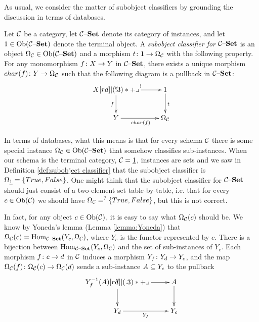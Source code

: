 \documentclass[CT4S-EN-RU]{subfiles}
\begin{document}
\begin{blockRUS}
\end{blockRUS}

\begin{blockENG}
As usual, we consider the matter of subobject classifiers by grounding the discussion in terms of databases.
\end{blockENG}

\begin{blockRUS}
\end{blockRUS}

\begin{definitionENG}
Let $\mcC$ be a category, let $\mcC\set$ denote its category of instances, and let $1\in\Ob(\mcC\set)$ denote the terminal object. A {\em subobject classifier for $\mcC\set$} is an object $\Omega_\mcC\in\Ob(\mcC\set)$ and a morphism $t\taking 1\to\Omega_\mcC$ with the following property. For any monomorphism $f\taking X\to Y$ in $\mcC\set$, there exists a unique morphism $char(f)\taking Y\to\Omega_\mcC$ such that the following diagram is a pullback in $\mcC\set$:
$$
\xymatrix@=25pt{X\ar[r]^{!}\ar[d]_f\ullimit&1\ar[d]^t\\Y\ar[r]_{char(f)}&\Omega_\mcC
}
$$
\end{definitionENG}

\begin{definitionRUS}
\end{definitionRUS}

\begin{blockENG}
In terms of databases, what this means is that for every schema $\mcC$ there is some special instance $\Omega_\mcC\in\Ob(\mcC\set)$ that somehow classifies sub-instances. When our schema is the terminal category, $\mcC=\ul{1}$, instances are sets and we saw in Definition \ref{def:subobject classifier} that the subobject classifier is $\Omega_{\ul{1}}=\{True, False\}$. One might think that the subobject classifier for $\mcC\set$ should just consist of a two-element set table-by-table, i.e. that for every $c\in\Ob(\mcC)$ we should have $\Omega_{\mcC}=^?\{True,False\}$, but this is not correct. 
\end{blockENG}

\begin{blockRUS}
\end{blockRUS}

\begin{blockENG}
In fact, for any object $c\in\Ob(\mcC)$, it is easy to say what $\Omega_\mcC(c)$ should be. We know by Yoneda's lemma (Lemma \ref{lemma:Yoneda}) that $\Omega_\mcC(c)=\Hom_{\mcC\set}(Y_c,\Omega_\mcC)$, where $Y_c$ is the functor represented by $c$. There is a bijection between $\Hom_{\mcC\set}(Y_c,\Omega_\mcC)$ and the set of sub-instances of $Y_c$. Each morphism $f\taking c\to d$ in $\mcC$ induces a morphism $Y_f\taking Y_d\to Y_c$, and the map $\Omega_\mcC(f)\taking\Omega_\mcC(c)\to\Omega_\mcC(d)$ sends a sub-instance $A\ss Y_c$ to the pullback 
$$
\xymatrix{Y_f^\m1(A)\ar[r]\ar[d]\ullimit&A\ar[d]\\Y_d\ar[r]_{Y_f}&Y_c}
$$
\end{blockENG}
\end{document}
